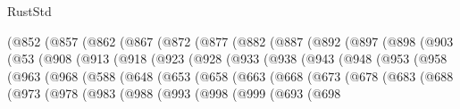 \begin{lexlean}{RustStd}
\begin{coremodule}
{\begin{coremodule}
{{{{{{{{{{{{{{        (@852
          (@857
            (@862
              (@867
                (@872
                  (@877
                    (@882
                      (@887
                        (@892
                          (@897
                            (@898
                              (@903
                                (@53
                                  (@908
                                    (@913
                                      (@918
                                        (@923
                                          (@928
                                            (@933
                                              (@938
                                                (@943
                                                  (@948
                                                    (@953
                                                      (@958
                                                        (@963
                                                          (@968
                                                            (@588
                                                              (@648
                                                                (@653
                                                                  (@658
                                                                    (@663
                                                                      (@668
                                                                        (@673
                                                                          (@678
                                                                            (@683
                                                                              (@688
                                                                                (@973
                                                                                  (@978
                                                                                    (@983
                                                                                      (@988
                                                                                        (@993
                                                                                          (@998
                                                                                            (@999
                                                                                              (@693
                                                                                                (@698
}}}}}}}}}}}}}}
\end{coremodule}}
\end{coremodule}
\end{lexlean}
